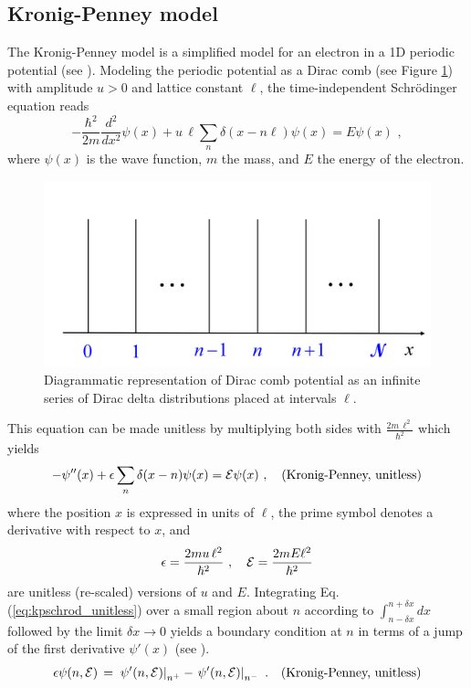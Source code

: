 \subsection{Kronig-Penney model}
\label{subsec:kp}
\noindent
The Kronig-Penney model is a simplified model for an electron in a 1D periodic potential
(see \cite{Kittel1996_Solid_State}).
Modeling the periodic potential as a Dirac comb (see Figure \ref{fig:dirac_comb}) with amplitude $u>0$
and lattice constant $\ell$, the time-independent Schr\"odinger equation reads
%
\begin{equation} \label{eq:kpschrod}
- \frac{\hbar^2}{2 m} \frac{d^2}{dx^2} \psi(x) + u \, \ell \sum_n \delta(x - n \ell) \psi(x) = E \psi(x) \, \, , 
\end{equation}
%
where $\psi(x)$ is the wave function, $m$ the mass, and $E$ the energy 
of the electron.
%
\begin{figure}
    \includegraphics[width=\textwidth, keepaspectratio]{figures/system/dirac_comb.png}
    \caption{Diagrammatic representation of Dirac comb potential as an infinite series of Dirac delta distributions placed at intervals $\ell$.}
    \label{fig:dirac_comb}
\end{figure}
%
This equation can be made unitless by multiplying both sides
with $\displaystyle \frac{2 m \, \ell^2}{\hbar^2}$ which yields
%
\begin{equation} \label{eq:kpschrod_unitless}
- \psi''(x) + \epsilon \sum_n \delta(x - n) \psi(x) = {\cal E} \psi(x) \, \, , \quad \text{(Kronig-Penney, unitless)} 
\end{equation}
%
where the position $x$ is expressed in units of $\ell$, the prime symbol denotes a derivative
with respect to $x$, and
%
\begin{equation} \label{eq:kpschrod_param}
\epsilon = \frac{2 m u \, \ell^2}{\hbar^2} \, \, , \quad {\cal E} = \frac{2 m E \ell^2}{\hbar^2}
\end{equation}
%
are unitless (re-scaled) versions of $u$ and $E$.
\newpage
Integrating Eq.\,(\ref{eq:kpschrod_unitless}) over a small region about  
$n$ according to $\displaystyle \int_{n - \delta x}^{n + \delta x} dx$ \,
followed by the limit $\delta x \to 0$ yields
a boundary condition at $n$ in terms of a jump of the first derivative $\psi'(x)$ (see \cite{Kittel1996_Solid_State}).
%
\begin{equation}\label{eq:kpjump}
\epsilon \psi(n,{\cal E}) \, = \, 
\left. \psi'(n,{\cal E}) \right|_{n^{+}} - \left. \psi'(n,{\cal E}) \right|_{n^{-}} \, \, .
\quad \text{(Kronig-Penney, unitless)}
\end{equation}

